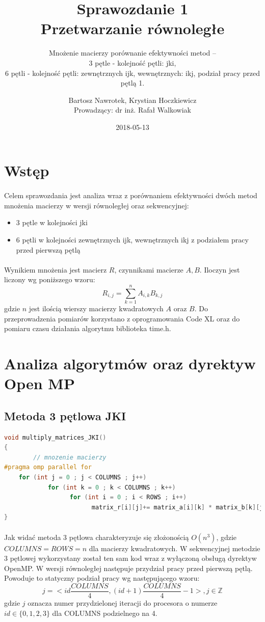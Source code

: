 \documentclass{scrartcl}
\title{Sprawozdanie 1 \\ Przetwarzanie równoległe}
\subtitle{Mnożenie macierzy porównanie efektywności metod –\\
3 pętle - kolejność pętli: jki,\\
6 pętli - kolejność pętli: zewnętrznych ijk, wewnętrznych: ikj, podział pracy przed pętlą 1.}
\date{2018-05-13}
\author{Bartosz Nawrotek, Krystian Hoczkiewicz \\
Prowadzący: dr inż. Rafał Walkowiak}
\begin{document}
\maketitle
\section{Wstęp}
\paragraph{}Celem sprawozdania jest analiza wraz z porównaniem efektywności dwóch metod mnożenia macierzy w wersji równoległej oraz sekwencyjnej:
\begin{itemize}
\item {3 pętle w kolejności jki}
\item {6 pętli w kolejności zewnętrznych ijk, wewnętrznych ikj z podziałem pracy przed pierwszą pętlą}
\end{itemize}
\paragraph{}Wynikiem mnożenia jest macierz $R$, czynnikami macierze $A, B$. Iloczyn jest liczony wg poniższego wzoru:
\begin{equation}
R_{i, j} = \sum_{k = 1}^{n}{A_{i, k}B_{k, j}}
\end{equation}
gdzie $n$ jest ilością wierszy macierzy kwadratowych $A$ oraz $B$.
Do przeprowadzenia pomiarów korzystano z oprogramowania Code XL oraz do pomiaru czasu działania algorytmu biblioteka time.h.
\section{Analiza algorytmów oraz dyrektyw Open MP}
\subsection{Metoda 3 pętlowa JKI}
\begin{lstlisting}[language=C++, caption={Metoda trzypętlowa}]
void multiply_matrices_JKI()
{
        // mnozenie macierzy 
#pragma omp parallel for 
	for (int j = 0 ; j < COLUMNS ; j++)
      	    for (int k = 0 ; k < COLUMNS ; k++) 
                  for (int i = 0 ; i < ROWS ; i++) 
                        matrix_r[i][j]+= matrix_a[i][k] * matrix_b[k][j] ;              
}
\end{lstlisting}
\paragraph{}Jak widać metoda 3 pętlowa charakteryzuje się złożonością $O(n^3)$, gdzie $COLUMNS = ROWS = n$ dla macierzy kwadratowych. W sekwencyjnej metodzie 3 pętlowej wykorzystany został ten sam kod wraz z wyłączoną obsługą dyrektyw OpenMP. W wersji równoległej następuje przydział pracy przed pierwszą pętlą. Powoduje to statyczny podział pracy wg następującego wzoru:
\begin{equation}
j = <id \frac{COLUMNS}{4}, (id + 1)\frac{COLUMNS}{4} - 1>,
j \in \mathbb{Z}
\end{equation}
gdzie $j$ oznacza numer przydzielonej iteracji do procesora o numerze $id \in \{0, 1, 2, 3\}$ dla COLUMNS podzielnego na 4.
\end{document}
